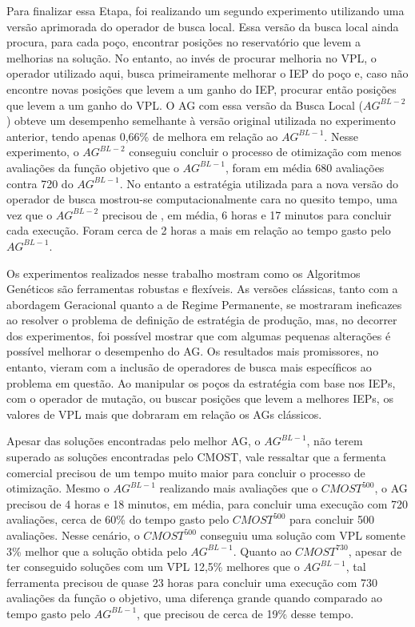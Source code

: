 Para finalizar essa Etapa, foi realizando um segundo experimento utilizando uma versão aprimorada do operador de busca local. Essa versão da busca local ainda procura, para cada poço, encontrar posições no reservatório que levem a melhorias na solução. No entanto, ao invés de procurar melhoria no VPL, o operador utilizado aqui, busca primeiramente melhorar o IEP do poço e, caso não encontre novas posições que levem a um ganho do IEP, procurar então posições que levem a um ganho do VPL. O AG com essa versão da Busca Local ($AG^{BL-2}$) obteve um desempenho semelhante à versão original utilizada no experimento anterior, tendo apenas 0,66\% de melhora em relação ao $AG^{BL-1}$.  Nesse experimento, o $AG^{BL-2}$ conseguiu concluir o processo de otimização com menos avaliações da função objetivo que o $AG^{BL-1}$, foram em média 680 avaliações contra 720 do $AG^{BL-1}$. No entanto a estratégia utilizada para a nova versão do operador de busca mostrou-se computacionalmente cara no quesito tempo, uma vez que o $AG^{BL-2}$ precisou de , em média, 6 horas e 17 minutos para concluir cada execução. Foram cerca de 2 horas a mais em relação ao tempo gasto pelo $AG^{BL-1}$.
 	
Os experimentos realizados nesse trabalho mostram como os Algoritmos Genéticos são ferramentas robustas e flexíveis. As versões clássicas, tanto com a abordagem Geracional quanto a de Regime Permanente, se mostraram ineficazes ao resolver o problema de definição de estratégia de produção, mas, no decorrer dos experimentos, foi possível mostrar que com algumas pequenas alterações é possível melhorar o desempenho do AG. Os resultados mais promissores, no entanto, vieram com a inclusão de operadores de busca mais específicos ao problema em questão. Ao manipular os poços da estratégia com base nos IEPs, com o operador de mutação, ou buscar posições que levem a melhores IEPs, os valores de VPL mais que dobraram em relação os AGs clássicos.
 	
Apesar das soluções encontradas pelo melhor AG, o $AG^{BL-1}$, não terem superado as soluções encontradas pelo CMOST, vale ressaltar que a fermenta comercial precisou de um tempo muito maior para concluir o processo de otimização. Mesmo o $AG^{BL-1}$ realizando mais avaliações que o $CMOST^{500}$, o AG precisou de 4 horas e 18 minutos, em média, para concluir uma execução com 720 avaliações, cerca de 60\% do tempo gasto pelo $CMOST^{500}$ para concluir 500 avaliações. Nesse cenário, o $CMOST^{500}$ conseguiu uma solução com VPL somente 3\% melhor que a solução obtida pelo $AG^{BL-1}$. Quanto ao $CMOST^{730}$, apesar de ter conseguido soluções com um VPL 12,5\% melhores que o $AG^{BL-1}$, tal ferramenta precisou de quase 23 horas para concluir uma execução com 730 avaliações da função o objetivo, uma diferença grande quando comparado ao tempo gasto pelo $AG^{BL-1}$, que precisou de cerca de 19\% desse tempo.

